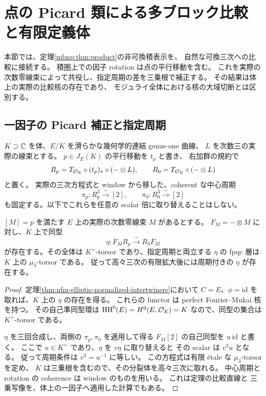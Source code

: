 \section{点の Picard 類による多ブロック比較と有限定義体}
\label{mbrc:sec:rotation-comparison}

本節では、定理\ref{mbnp:thm:product}の非可換積表示を、
自然な可換三次への比較に接続する。
積圏上での因子 rotation は点の平行移動を含む。
これを実際の次数零線束によって共役し、指定周期の差を三乗根で補正する。
その結果は体上の実際の比較核の存在であり、
モジュライ全体における核の大域切断とは区別する。

\subsection{一因子の Picard 補正と指定周期}

$K\supset\mathbb C$ を体、$E/K$ を滑らかな幾何学的連結 genus-one 曲線、
$L$ を次数三の実際の線束とする。
$p\in J_E(K)$ の平行移動を $t_p$ と書き、
右加群の規約で
\[
 R_p=T_{\mathcal O_E}\circ(t_p)_*\circ(-\otimes L),\qquad
 R_0=T_{\mathcal O_E}\circ(-\otimes L)
\]
と置く。
実際の三次方程式と window から移した、coherent な中心周期
\[
 \pi_p:R_p^3\xrightarrow{\sim}[2],\qquad
 \pi_0:R_0^3\xrightarrow{\sim}[2]
\]
も固定する。以下でこれらを任意の scalar 倍に取り替えることはしない。

\begin{lemma}
\label{mbrc:lem:factor-correction}
$[M]=p$ を満たす $E$ 上の実際の次数零線束 $M$ があるとする。
$F_M=-\otimes M$ に対し、$K$ 上で同型
\[
 \eta:F_MR_p\xrightarrow{\sim}R_0F_M
\]
が存在する。その全体は $K^\times$-torsor であり、指定周期と両立する
$\eta$ の fpqc 層は $K$ 上の $\mu_3$-torsor である。
従って高々三次の有限拡大後には周期付きの $\eta$ が存在する。
\end{lemma}
\begin{proof}
定理\ref{thm:nfm-elliptic-normalized-intertwiners}において
$C=E$、$\phi=\mathrm{id}$ を取れば、$K$ 上の $\eta$ の存在を得る。
これらの functor は perfect Fourier--Mukai 核を持つ。
その自己準同型環は
$\mathrm{HH}^0(E)=H^0(E,\mathcal O_E)=K$ なので、同型の集合は
$K^\times$-torsor である。

$\eta$ を三回合成し、両側の $\pi_p,\pi_0$ を適用して得る
$F_M[2]$ の自己同型を $u\,\mathrm{id}$ と書く。
ここで $u\in K^\times$ であり、$\eta$ を $v\eta$ に取り替えると
その scalar は $v^3u$ となる。
従って周期条件は $v^3=u^{-1}$ に等しい。
この方程式は有限 \'etale な $\mu_3$-torsor を定め、
$K$ は三乗根を含むので、その分裂体を高々三次に取れる。
中心周期と rotation の coherence は window のものを用いる。
これは定理の比較直線と
三乗写像を、体上の一因子へ適用した計算でもある。
\end{proof}

